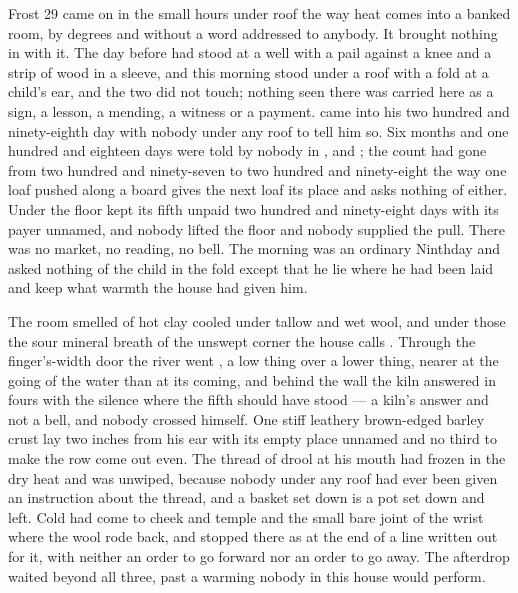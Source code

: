 
Frost 29 came on in the small hours under  roof the way heat comes into a banked room, by degrees and without a word addressed to anybody. It brought nothing in with it. The day before had stood at a well with a pail against a knee and a strip of wood in a sleeve, and this morning stood under a roof with a fold at a child's ear, and the two did not touch; nothing seen there was carried here as a sign, a lesson, a mending, a witness or a payment.  came into his two hundred and ninety-eighth day with nobody under any roof to tell him so. Six months and one hundred and eighteen days were told by nobody in ,  and ; the count had gone from two hundred and ninety-seven to two hundred and ninety-eight the way one loaf pushed along a board gives the next loaf its place and asks nothing of either. Under the floor  kept its fifth unpaid two hundred and ninety-eight days with its payer unnamed, and nobody lifted the floor and nobody supplied the pull. There was no market, no reading, no bell. The morning was an ordinary Ninthday and asked nothing of the child in the fold except that he lie where he had been laid and keep what warmth the house had given him.

The room smelled of hot clay cooled under tallow and wet wool, and under those the sour mineral breath of the unswept corner the house calls . Through the finger's-width door the river went , a low thing over a lower thing, nearer at the going of the water than at its coming, and behind the wall the kiln answered in fours with the silence where the fifth should have stood --- a kiln's answer and not a bell, and nobody crossed himself. One stiff leathery brown-edged barley crust lay two inches from his ear with its empty place unnamed and no third to make the row come out even. The thread of drool at his mouth had frozen in the dry heat and was unwiped, because nobody under any roof had ever been given an instruction about the thread, and a basket set down is a pot set down and left. Cold had come to cheek and temple and the small bare joint of the wrist where the wool rode back, and stopped there as at the end of a line written out for it, with neither an order to go forward nor an order to go away. The afterdrop waited beyond all three, past a warming nobody in this house would perform.

